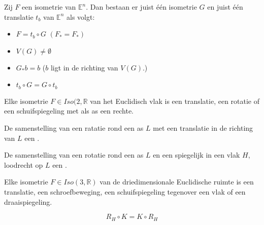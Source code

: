 \documentclass[main.tex]{subfiles}
\begin{document}
\begin{st}
  Zij $F$ een isometrie van $\mathbb{E}^{n}$.
  Dan bestaan er juist \'e\'en isometrie $G$ en juist \'e\'en translatie $t_{b}$ van $\mathbb{E}^{n}$ als volgt:
  \begin{itemize}
  \item $F = t_{b} \circ G$ $(F_{*} = F_{*})$
  \item $V(G) \neq \emptyset$
  \item $G_{*}b = b$ ($b$ ligt in de richting van $V(G)$.)
  \item $t_{b}\circ G = G \circ t_{b}$
  \end{itemize}
\end{st}

\begin{st}
  Elke isometrie $F\in Iso(2,\mathbb{R}$ van het Euclidisch vlak is een translatie, een rotatie of een schuifspiegeling met als as een rechte.
\end{st}

\begin{de}
  De samenstelling van een ratatie rond een as $L$ met een translatie in de richting van $L$ een .
\end{de}

\begin{de}
  De samenstelling van een rotatie rond een as $L$ en een spiegelijk in een vlak $H$, loodrecht op $L$ een .
\end{de}

\begin{st}
  Elke isometrie $F\in Iso(3,\mathbb{R})$ van de driedimensionale Euclidische ruimte is een translatie, een schroefbeweging, een schuifspiegeling tegenover een vlak of een draaispiegeling.
\end{st}

\begin{st}
  \[ R_{H} \circ K = K \circ R_{H} \]
\end{st}
\end{document}
